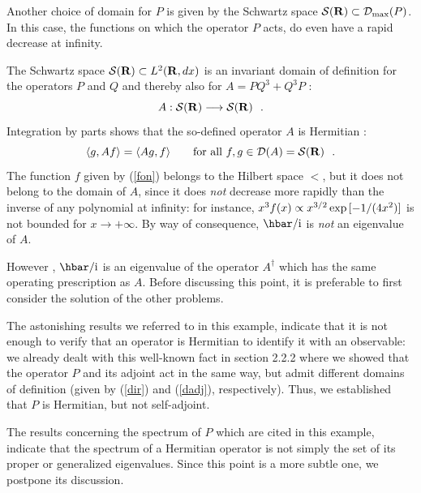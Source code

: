 \documentclass[12pt]{report}
\def\underline{\relax}
\begin{document}
Another choice of domain for $P$ is given by the 
Schwartz space ${\cal S}({\bf R})
\subset {\cal D}_{{\rm max}} (P)$.
In this case, the functions on which the operator $P$ acts,  
 do even have a rapid decrease at infinity. 
 
\bigskip
 
\underline{{\bf (3a)}}
The Schwartz space ${\cal S}({\bf R}) \subset {L^2 ({{\bf R}},dx)}$ is an invariant  
domain of definition for the operators $P$ and $Q$ 
and thereby also for  
$A= PQ^3 +Q^3 P$ :
\[
A : {\cal S}({\bf R}) \longrightarrow {\cal S}({\bf R})
\ \ .
\]
Integration by parts shows that the so-defined operator 
$A$ is Hermitian :
\[
\langle g , A f \rangle  =
\langle A g , f \rangle
\qquad \mbox{for all} \ f,g \in {\cal D}(A) = {\cal S}({\bf R})
\ \ .
\]
The function $f$ given by (\ref{fon}) belongs to the Hilbert space 
$\lt$, but it does not belong to the domain 
of $A$, since it does {\em not} 
decrease more rapidly than the inverse 
of any polynomial at infinity: for instance, 
$x^3 f(x) \propto  x^{3/2} \, {\rm exp}\, [-1 /(4x^2)]$ 
is not bounded for 
$x \to +\infty$.
 By way of consequence, 
$\hbar /\ri$ is {\em not} an eigenvalue of $A$.
 
However \cite{blt}, 
$\hbar /\ri$ is an eigenvalue of the operator  
$A^{\dag}$ which has the same operating prescription as $A$.  
Before discussing this point, it is preferable to first consider the
solution of the other problems.  
 
\bigskip
 
\underline{{\bf (4a)}}
The astonishing 
results we referred to in this example, 
indicate that it is not enough 
to verify that an operator is Hermitian to identify it with  
an observable: 
we already dealt with this well-known fact 
in section 2.2.2 where 
we showed that the operator $P$ 
and its adjoint act in the same way, but admit  
different domains of definition 
(given by (\ref{dir}) and (\ref{dadj}), respectively).
Thus, we established that $P$ 
is Hermitian, but not self-adjoint.
 
The results concerning the spectrum of $P$ 
which are cited in this example, indicate that 
the spectrum of a Hermitian operator is not simply the set 
of its proper or generalized 
eigenvalues.
Since this point is a more subtle one, we postpone 
its discussion. 


 
\bigskip
 
\end{document}
